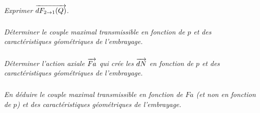 \documentclass[10pt]{article}
\begin{document}
\subparagraph{}
\textit{Exprimer $\overrightarrow{dF_{2\rightarrow 1}(Q)}$.}

\subparagraph{}
\textit{Déterminer le couple maximal transmissible en fonction de $p$ et des caractéristiques 
géométriques de l’embrayage.}

\subparagraph{}
\textit{Déterminer l’action axiale $\overrightarrow{Fa}$ qui crée les $\overrightarrow{dN}$ en fonction de $p$ et des caractéristiques géométriques de l’embrayage.}

\subparagraph{}
\textit{En déduire le couple maximal transmissible en fonction de $Fa$ (et non en fonction de $p$) et des caractéristiques géométriques de l’embrayage.}
\end{document}
